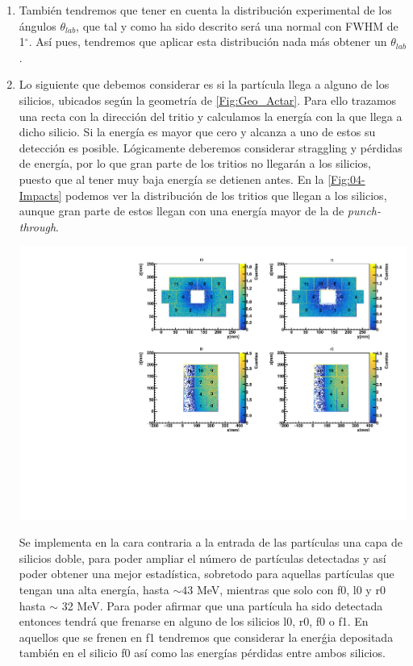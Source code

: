 \begin{enumerate}
\begin{minipage}{0.49\linewidth}
        \label{Fig:04-kinSampled2}
    \end{minipage}

    \item También tendremos que tener en cuenta la distribución experimental de los ángulos $\theta_{lab}$, que tal y como ha sido descrito será una normal con FWHM de 1$^{\circ}$. Así pues, tendremos que aplicar esta distribución nada más obtener un $\theta_{lab}$. 

    
    \item Lo siguiente que debemos considerar es si la partícula llega a alguno de los silicios, ubicados según la geometría de \cref{Fig:Geo_Actar}. Para ello trazamos una recta con la dirección del tritio y calculamos la energía con la que llega a dicho silicio. Si la energía es mayor que cero y alcanza a uno de estos su detección es posible. Lógicamente deberemos considerar straggling y pérdidas de energía, por lo que gran parte de los tritios no llegarán a los silicios, puesto que al tener muy baja energía se detienen antes. En la \cref{Fig:04-Impacts} podemos ver la distribución de los tritios que llegan a los silicios, aunque gran parte de estos llegan con una energía mayor de la de \textit{punch-through}.
    

    \begin{center}
        \includegraphics[width=0.95\linewidth]{Imagenes/Impacts/Impacts_Ex0.00_incIdx0.pdf}

        \label{Fig:04-Impacts}
    \end{center}
    

    Se implementa en la cara contraria a la entrada de las partículas una capa de silicios doble, para poder ampliar el número de partículas detectadas y así poder obtener una mejor estadística, sobretodo para aquellas partículas que tengan una alta energía, hasta $\sim 43$ MeV, mientras que solo con f0, l0 y r0 hasta $\sim$ 32 MeV. Para poder afirmar que una partícula ha sido detectada entonces tendrá que frenarse en alguno de los silicios l0, r0, f0 o f1. En aquellos que se frenen en f1 tendremos que considerar la enerǵia depositada también en el silicio f0 así como las energías pérdidas entre ambos silicios.


\end{enumerate}
